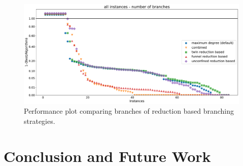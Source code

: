 \documentclass[a4paper,UKenglish,cleveref, autoref, thm-restate]{lipics-v2021}
\begin{document}
\begin{figure}[t]
  \includegraphics[width=\textwidth]{plots/all_reduction_based_branch}
  \caption{Performance plot comparing branches of reduction based branching strategies.}
  \label{fig:all_reduction_branch}
\end{figure}


\section{Conclusion and Future Work}


\FloatBarrier


\newpage

\appendix
\end{document}
